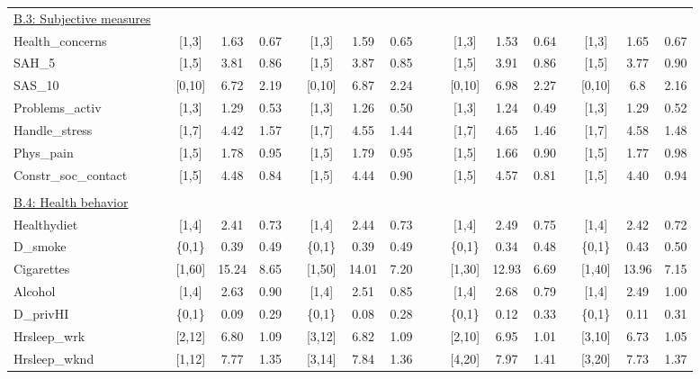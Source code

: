 \begin{center}
{\begin{longtable}{l*{17}{c}}
\\	%
\underline{B.3: Subjective measures}\\
Health\_concerns & & [1,3] & 1.63 &0.67 &  & [1,3] & 1.59 &0.65 &  &  & [1,3] & 1.53 &0.64 &  & [1,3] & 1.65 &0.67 \\ 
SAH\_5 & & [1,5] & 3.81 &0.86 &  & [1,5] & 3.87 &0.85 &  &  & [1,5] & 3.91 &0.86 &  & [1,5] & 3.77 &0.90 \\ 
SAS\_10 & & [0,10] & 6.72 & 2.19 &  & [0,10] & 6.87 & 2.24 &  &  & [0,10] & 6.98 & 2.27 &  & [0,10] & 6.8 & 2.16 \\ 
Problems\_activ & & [1,3] & 1.29 &0.53 &  & [1,3] & 1.26 &0.50 &  &  & [1,3] & 1.24 &0.49 &  & [1,3] & 1.29 &0.52 \\ 
Handle\_stress & & [1,7] & 4.42 & 1.57 &  & [1,7] & 4.55 & 1.44 &  &  & [1,7] & 4.65 & 1.46 &  & [1,7] & 4.58 & 1.48 \\ 
Phys\_pain & & [1,5] & 1.78 &0.95 &  & [1,5] & 1.79 &0.95 &  &  & [1,5] & 1.66 &0.90 &  & [1,5] & 1.77 &0.98 \\ 
Constr\_soc\_contact & & [1,5] & 4.48 &0.84 &  & [1,5] & 4.44 &0.90 &  &  & [1,5] & 4.57 &0.81 &  & [1,5] & 4.40 &0.94 \\ 





\\	%
\underline{B.4: Health behavior}\\
Healthydiet & & [1,4] & 2.41 &0.73 &  & [1,4] & 2.44 &0.73 &  &  & [1,4] & 2.49 &0.75 &  & [1,4] & 2.42 &0.72 \\ 
D\_smoke & & \{0,1\} &0.39 &0.49 &  & \{0,1\} &0.39 &0.49 &  &  & \{0,1\} &0.34 &0.48 &  & \{0,1\} &0.43 &0.50 \\ 
Cigarettes & & [1,60] & 15.24 & 8.65 &  & [1,50] & 14.01 & 7.20 &  &  & [1,30] & 12.93 & 6.69 &  & [1,40] & 13.96 & 7.15 \\ 
Alcohol & & [1,4] & 2.63 &0.90 &  & [1,4] & 2.51 &0.85 &  &  & [1,4] & 2.68 &0.79 &  & [1,4] & 2.49 & 1.00 \\ 
D\_privHI & & \{0,1\} &0.09 &0.29 &  & \{0,1\} &0.08 &0.28 &  &  & \{0,1\} &0.12 &0.33 &  & \{0,1\} &0.11 &0.31 \\ 
Hrsleep\_wrk & & [2,12] & 6.80 & 1.09 &  & [3,12] & 6.82 & 1.09 &  &  & [2,10] & 6.95 & 1.01 &  & [3,10] & 6.73 & 1.05 \\ 
Hrsleep\_wknd & & [1,12] & 7.77 & 1.35 &  & [3,14] & 7.84 & 1.36 &  &  & [4,20] & 7.97 & 1.41 &  & [3,20] & 7.73 & 1.37 
\end{longtable}}
\end{center}
